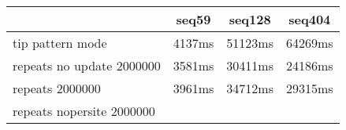\begin{tabular}{|l|c|c|c|}
\hline
 & seq59 & seq128 & seq404  \\
\hline
tip pattern mode &  4137ms &  51123ms &  64269ms\\
\hline
repeats no update 2000000 &  3581ms &  30411ms &  24186ms\\
\hline
repeats 2000000 &  3961ms &  34712ms &  29315ms\\
\hline
repeats nopersite 2000000 &  &  & \\
\hline
\end{tabular}
